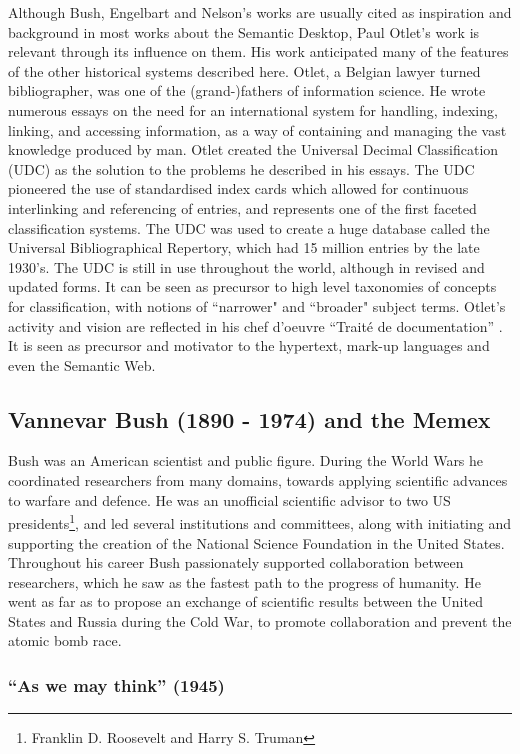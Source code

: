 Although Bush, Engelbart and Nelson's works are usually cited as inspiration and background in most works about the Semantic Desktop, Paul Otlet's work is relevant through its influence on them. His work anticipated many of the features of the other historical systems described here.
Otlet, a Belgian lawyer turned bibliographer, was one of the (grand-)fathers of information science. He wrote numerous essays on the need for an international system for handling, indexing, linking, and accessing information, as a way of containing and managing the vast knowledge produced by man. Otlet created the Universal Decimal Classification (UDC) as the solution to the problems he described in his essays. The UDC pioneered the use of standardised index cards which allowed for continuous interlinking and referencing of entries, and represents one of the first faceted classification systems. The UDC was used to create a huge database called the Universal Bibliographical Repertory, which had 15 million entries by the late 1930's. The UDC is still in use throughout the world, although in revised and updated forms. It can be seen as precursor to high level taxonomies of concepts for classification, with notions of ``narrower" and ``broader" subject terms. 
Otlet's activity and vision are reflected in his chef d'oeuvre ``Trait\'{e} de documentation'' \cite{Otlet1934}. It is seen as precursor and motivator to the hypertext, mark-up languages and even the Semantic Web.

\subsection{Vannevar Bush (1890 - 1974) and the Memex}
\label{sub:bush}

Bush was an American scientist and public figure. During the World Wars he coordinated researchers from many domains, towards applying scientific advances to warfare and defence. He was an unofficial scientific advisor to two US presidents\footnote{Franklin D. Roosevelt and Harry S. Truman}, and led several institutions and committees, along with initiating and supporting the creation of the National Science Foundation in the United States. Throughout his career Bush passionately supported collaboration between researchers, which he saw as the fastest path to the progress of humanity. He went as far as to propose an exchange of scientific results between the United States and Russia during the Cold War, to promote collaboration and prevent the atomic bomb race.

\subsubsection{``As we may think'' (1945)}


